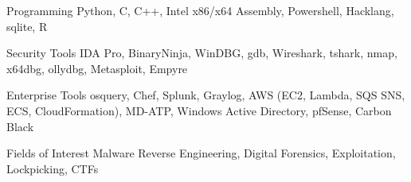 


\begin{cvskills}


\cvskill
{Programming} %
{Python, C, C++, Intel x86/x64 Assembly, Powershell, Hacklang, sqlite, R} %


\cvskill
{Security Tools} %
{IDA Pro, BinaryNinja, WinDBG, gdb, Wireshark, tshark, nmap, x64dbg, ollydbg, Metasploit, Empyre} %


\cvskill
{Enterprise Tools} %
{osquery, Chef, Splunk, Graylog, AWS (EC2, Lambda, SQS SNS, ECS, CloudFormation), MD-ATP, Windows Active Directory, pfSense, Carbon Black} %


\cvskill
{Fields of Interest} %
{Malware Reverse Engineering, Digital Forensics, Exploitation, Lockpicking, CTFs} %


\end{cvskills}

